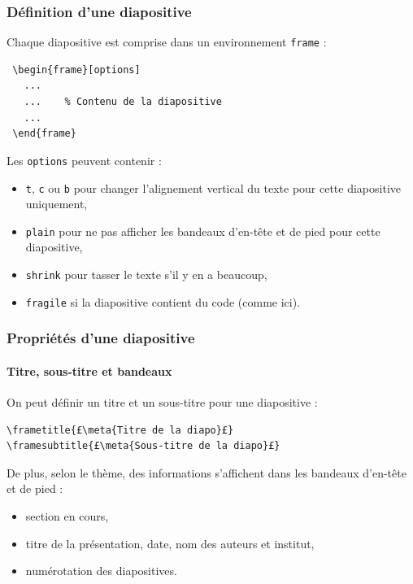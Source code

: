 \begin{frame}[fragile]
  \frametitle{Définition d'une diapositive}

Chaque diapositive est comprise dans un environnement \lstinline?frame? :

\begin{lstlisting}
 \begin{frame}[options]
   ...
   ...    % Contenu de la diapositive
   ...
 \end{frame}
\end{lstlisting}

\medskip
Les \lstinline?options? peuvent contenir :
\begin{itemize}
  \item \lstinline?t?, \lstinline?c? ou \lstinline?b? pour changer l'alignement vertical du texte pour cette diapositive uniquement,
  \item \lstinline?plain? pour ne pas afficher les bandeaux d'en-tête et de pied pour cette diapositive,
  \item \lstinline?shrink? pour tasser le texte s'il y en a beaucoup,
  \item \lstinline?fragile? si la diapositive contient du code (comme ici).
\end{itemize}
\end{frame}



\begin{frame}[fragile]
  \frametitle{Propriétés d'une diapositive}
  \framesubtitle{Titre, sous-titre et bandeaux}

On peut définir un titre et un sous-titre pour une diapositive :

\begin{lstlisting}
\frametitle{£\meta{Titre de la diapo}£}
\framesubtitle{£\meta{Sous-titre de la diapo}£}
\end{lstlisting}

\bigskip
De plus, selon le thème, des informations s'affichent dans les bandeaux d'en-tête et de pied :
\begin{itemize}
  \item section en cours,
  \item titre de la présentation, date, nom des auteurs et institut,
  \item numérotation des diapositives.
\end{itemize}
\end{frame}



